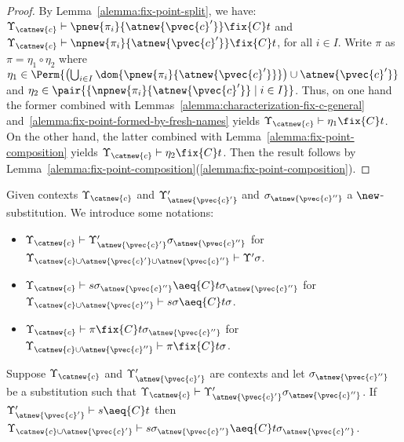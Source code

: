  \begin{proof}
     By Lemma~\ref{alemma:fix-point-split}, we have: $\Upsilon_{\catnew{c}}\vdash \pnew{\pi_i}{\atnew{\pvec{c}'}}\fix{C} t$ and $\Upsilon_{\catnew{c}}\vdash \npnew{\pi_i}{\atnew{\pvec{c}'}}\fix{C} t$, for all $i\in I$. Write $\pi$ as $\pi = \eta_1\circ \eta_2$ where $\eta_1 \in \Perm{\left(\bigcup_{i\in I} \dom{\pnew{\pi_i}{\atnew{\pvec{c}'}}}\right)\cup \atnew{\pvec{c}'}}$ and $\eta_2 \in\pair{\{\npnew{\pi_i}{\atnew{\pvec{c}'}} \mid i\in I\}}$. Thus, on one hand the former combined with Lemmas~\ref{alemma:characterization-fix-c-general} and~\ref{alemma:fix-point-formed-by-fresh-names} yields $\Upsilon_{\catnew{c}} \vdash \eta_1 \fix{C} t$. On the other hand, the latter combined with Lemma~\ref{alemma:fix-point-composition} yields $\Upsilon_{\catnew{c}}\vdash \eta_2\fix{C} t$. Then the result follows by Lemma~\ref{alemma:fix-point-composition}(\ref{alemma:fix-point-composition}).

 \end{proof}


Given contexts $\Upsilon_{\catnew{c}}$ and $\Upsilon'_{\atnew{\pvec{c}'}}$ and $\sigma_{\atnew{\pvec{c}''}}$ a $\new$-substitution. We introduce some notations:
\begin{itemize}
    \item $\Upsilon_{\catnew{c}}\vdash \Upsilon'_{\atnew{\pvec{c}'}}\sigma_{\atnew{\pvec{c}''}}$ for $\Upsilon_{\catnew{c}\cup\atnew{\pvec{c}'}\cup\atnew{\pvec{c}''}}\vdash \Upsilon'\sigma$.
    \item $\Upsilon_{\catnew{c}}\vdash s\sigma_{\atnew{\pvec{c}''}} \aeq{C} t\sigma_{\atnew{\pvec{c}''}}$ for $\Upsilon_{\catnew{c}\cup\atnew{\pvec{c}''}}\vdash s\sigma \aeq{C} t\sigma$.

    \item $\Upsilon_{\catnew{c}}\vdash \pi\fix{C} t\sigma_{\atnew{\pvec{c}''}}$ for $\Upsilon_{\catnew{c}\cup\atnew{\pvec{c}''}}\vdash \pi \fix{C} t\sigma$.
\end{itemize}

 \begin{lemma}\label{alemma:preservation-by-subs}
     Suppose $\Upsilon_{\catnew{c}}$ and $\Upsilon'_{\atnew{\pvec{c}'}}$ are contexts and let $\sigma_{\atnew{\pvec{c}''}}$ be a substitution such that $\Upsilon_{\catnew{c}}\vdash \Upsilon'_{\atnew{\pvec{c}'}}\sigma_{\atnew{\pvec{c}''}}$. If $\Upsilon'_{\atnew{\pvec{c}'}}\vdash s\aeq{C}t$ then $\Upsilon_{\catnew{c}\cup\atnew{\pvec{c}'}}\vdash s\sigma_{\atnew{\pvec{c}''}}\aeq{C}t\sigma_{\atnew{\pvec{c}''}}$.
 \end{lemma}

